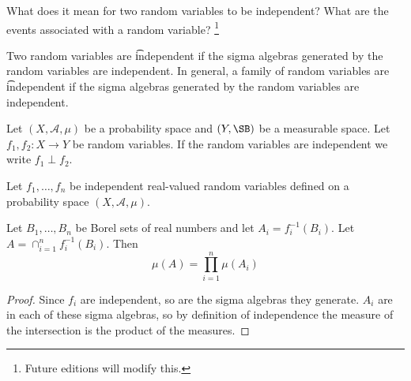 

What does it mean for two random variables to be independent?
What are the events associated with a random variable?
  \ifhmode\unskip\fi\footnote{
Future editions will modify this.
  }


Two random variables are \t{independent} if the sigma algebras generated by the random variables are independent.
In general, a family of random variables are \t{independent} if the sigma algebras generated by the random variables are independent.


Let $(X, \mathcal{A} , \mu )$ be a probability space and $(Y, \SB)$ be a measurable space.
Let $f_1,f_2: X \to Y$ be random variables.
If the random variables are independent we write $f_1 \perp f_2$.


\begin{prop}
Let $f_1, \dots , f_n$ be independent real-valued random variables defined on a probability space $(X, \mathcal{A} , \mu )$.

Let $B_1, \dots , B_n$ be Borel sets of real numbers and let $A_i = f_i^{-1}(B_i)$.
Let $A = \cap_{i = 1}^{n} f_i^{-1}(B_i)$.
Then
  \[
\mu (A) = \prod_{i = 1}^{n} \mu (A_i)
  \]
\begin{proof}
Since $f_i$ are independent, so are the sigma algebras they generate.
$A_i$ are in each of these sigma algebras, so by definition of independence the measure of the intersection is the product of the measures.
\end{proof}
\end{prop}
